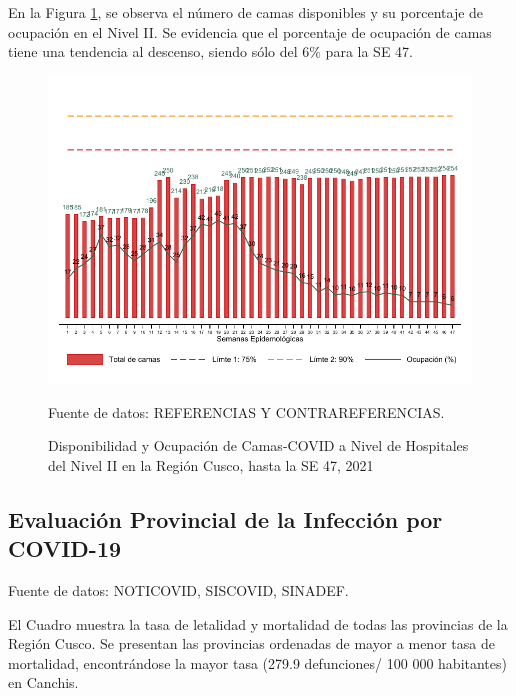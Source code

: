 \documentclass[12pt,a4paper,openany]{book}
\begin{document}
\clearpage

En la Figura \ref{fig:ocupacion_2nivel}, se observa el número de camas disponibles y su porcentaje de ocupación en el Nivel II. Se evidencia que el porcentaje de ocupación de camas tiene una tendencia al descenso, siendo sólo del 6$\%$ para la SE 47. 

\begin{figure}[h]
	\caption{Disponibilidad y Ocupación de Camas-COVID a Nivel de Hospitales del Nivel II en la Región Cusco, hasta la SE 47, 2021}\label{fig:ocupacion_2nivel}
	\begin{center}
		\includegraphics[width=0.95\linewidth]{../figuras/nivel_2.pdf}
	\end{center}
	{\footnotesize {Fuente de datos: REFERENCIAS Y CONTRAREFERENCIAS.}}
\end{figure}
\clearpage
\begin{landscape}
	
	\subsection*{Evaluación Provincial de la Infección por COVID-19} 
	
	
	{\footnotesize Fuente de datos: NOTICOVID, SISCOVID, SINADEF.}
	
	\noindent El Cuadro muestra la tasa de letalidad y mortalidad de todas las provincias de la Región Cusco. Se presentan las provincias ordenadas de mayor a menor tasa de mortalidad, encontrándose la mayor tasa (279.9 defunciones/ 100 000 habitantes) en Canchis. 
	
\end{landscape}
\end{document}
